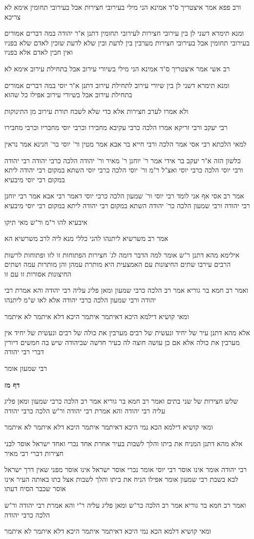 \documentclass[12pt, openany]{book}
\newcommand{\sethebfont}{
\fontsize{10.5pt}{21.0pt} \selectfont
}
\newcommand{\textblock}[1]{
{\sethebfont #1\\}	
}
\newcommand{\sectname}{}
\newcommand{\newsection}[1]{
	\addcontentsline{toc}{section}{#1}
	\renewcommand{\sectname}{#1}	
	\vspace{-\baselineskip}
	\begin{center}
		\textbf{%
\fontsize{16pt}{16pt}\selectfont
			#1}
	\end{center}
	\vspace{-\baselineskip}
	\nopagebreak
}
\begin{document}
\textblock{ורב פפא אמר איצטריך ס"ד אמינא הני מילי בעירובי חצירות אבל בעירובי תחומין אימא לא צריכא}
\textblock{ומנא תימרא דשני לן בין עירובי חצירות לעירובי תחומין דתנן א"ר יהודה במה דברים אמורים בעירובי תחומין אבל בעירובי חצירות מערבין בין לדעת ובין שלא לדעת שזכין לאדם שלא בפניו ואין חבין לאדם אלא בפניו}
\textblock{רב אשי אמר איצטריך ס"ד אמינא הני מילי בשיורי עירוב אבל בתחילת עירוב אימא לא}
\textblock{ומנא תימרא דשני לן בין שיורי עירוב לתחילת עירוב דתנן א"ר יוסי במה דברים אמורים בתחילת עירוב אבל בשיורי עירוב אפילו כל שהוא}
\textblock{ולא אמרו לערב חצירות אלא כדי שלא לשכח תורת עירוב מן התינוקות}
\textblock{רבי יעקב ורבי זריקא אמרו הלכה כרבי עקיבא מחבירו וכרבי יוסי מחבריו וכרבי מחבירו}
\textblock{למאי הלכתא רבי אסי אמר הלכה ורבי חייא בר אבא אמר מטין ור' יוסי בר' חנינא אמר נראין}
\textblock{כלשון הזה א"ר יעקב בר אידי אמר ר' יוחנן ר' מאיר ור' יהודה הלכה כרבי יהודה רבי יהודה ורבי יוסי הלכה כרבי יוסי ואצ"ל ר"מ ור' יוסי הלכה כרבי יוסי השתא במקום רבי יהודה ליתא במקום רבי יוסי מיבעיא}
\textblock{אמר רב אסי אף אני לומד רבי יוסי ור' שמעון הלכה כרבי יוסי דאמר רבי אבא אמר רבי יוחנן רבי יהודה ורבי שמעון הלכה כר' יהודה השתא במקום רבי יהודה ליתא במקום רבי יוסי מיבעיא}
\textblock{איבעיא להו ר"מ ור"ש מאי תיקו}
\textblock{אמר רב משרשיא ליתנהו להני כללי מנא ליה לרב משרשיא הא}
\textblock{אילימא מהא דתנן ר"ש אומר למה הדבר דומה לג' חצירות הפתוחות זו לזו ופתוחות לרשות הרבים עירבו שתים החיצונות עם האמצעית היא מותרת עמהן והן מותרות עמה ושתים החיצונות אסורות זו עם זו}
\textblock{ואמר רב חמא בר גוריא אמר רב הלכה כרבי שמעון ומאן פליג עליה רבי יהודה והא אמרת רבי יהודה ורבי שמעון הלכה כרבי יהודה אלא לאו ש"מ ליתנהו}
\textblock{ומאי קושיא דילמא היכא דאיתמר איתמר היכא דלא איתמר לא איתמר}
\textblock{אלא מהא דתנן עיר של יחיד ונעשית של רבים מערבין את כולה של רבים ונעשית של יחיד אין מערבין את כולה אלא אם כן עושה חוצה לה כעיר חדשה שביהודה שיש בה חמשים דיורין דברי רבי יהודה}
\textblock{רבי שמעון אומר}
\newsection{דף מז}
\textblock{שלש חצירות של שני בתים ואמר רב חמא בר גוריא אמר רב הלכה כרבי שמעון ומאן פליג עליה רבי יהודה והא אמרת רבי יהודה ור"ש הלכה כרבי יהודה}
\textblock{ומאי קושיא דילמא הכא נמי היכא דאיתמר איתמר היכא דלא איתמר לא איתמר}
\textblock{אלא מהא דתנן המניח את ביתו והלך לשבות בעיר אחרת אחד נכרי ואחד ישראל אוסר לבני חצירות דברי רבי מאיר}
\textblock{רבי יהודה אומר אינו אוסר רבי יוסי אומר נכרי אוסר ישראל אינו אוסר מפני שאין דרך ישראל לבא בשבת רבי שמעון אומר אפילו הניח את ביתו והלך לשבות אצל בתו באותה העיר אינו אוסר שכבר הסיח דעתו}
\textblock{ואמר רב חמא בר גוריא אמר רב הלכה כר"ש ומאן פליג עליה ר"י והא אמרת רבי יהודה ור"ש הלכה כרבי יהודה}
\textblock{ומאי קושיא דלמא הכא נמי היכא דאיתמר איתמר היכא דלא איתמר לא איתמר}
\end{document}
